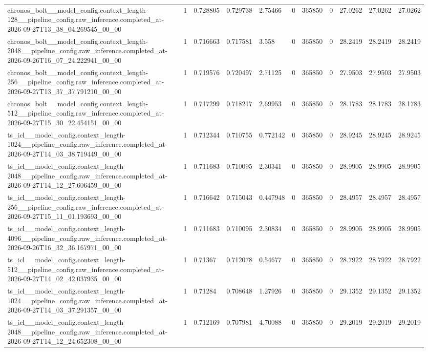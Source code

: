 \begin{tabular}{lllllllllll}
chronos\_bolt\_\_model\_config.context\_length-128\_\_pipeline\_config.raw\_inference.completed\_at-2026-09-27T13\_38\_04.269545\_00\_00 & 1 & 0.728805 & 0.729738 & 2.75466 & 0 & 365850 & 0 & 27.0262 & 27.0262 & 27.0262 \\
chronos\_bolt\_\_model\_config.context\_length-2048\_\_pipeline\_config.raw\_inference.completed\_at-2026-09-26T16\_07\_24.222941\_00\_00 & 1 & 0.716663 & 0.717581 & 3.558 & 0 & 365850 & 0 & 28.2419 & 28.2419 & 28.2419 \\
chronos\_bolt\_\_model\_config.context\_length-256\_\_pipeline\_config.raw\_inference.completed\_at-2026-09-27T13\_37\_37.791210\_00\_00 & 1 & 0.719576 & 0.720497 & 2.71125 & 0 & 365850 & 0 & 27.9503 & 27.9503 & 27.9503 \\
chronos\_bolt\_\_model\_config.context\_length-512\_\_pipeline\_config.raw\_inference.completed\_at-2026-09-27T15\_30\_22.454151\_00\_00 & 1 & 0.717299 & 0.718217 & 2.69953 & 0 & 365850 & 0 & 28.1783 & 28.1783 & 28.1783 \\
ts\_icl\_\_model\_config.context\_length-1024\_\_pipeline\_config.raw\_inference.completed\_at-2026-09-27T14\_03\_38.719449\_00\_00 & 1 & 0.712344 & 0.710755 & 0.772142 & 0 & 365850 & 0 & 28.9245 & 28.9245 & 28.9245 \\
ts\_icl\_\_model\_config.context\_length-2048\_\_pipeline\_config.raw\_inference.completed\_at-2026-09-27T14\_12\_27.606459\_00\_00 & 1 & 0.711683 & 0.710095 & 2.30341 & 0 & 365850 & 0 & 28.9905 & 28.9905 & 28.9905 \\
ts\_icl\_\_model\_config.context\_length-256\_\_pipeline\_config.raw\_inference.completed\_at-2026-09-27T15\_11\_01.193693\_00\_00 & 1 & 0.716642 & 0.715043 & 0.447948 & 0 & 365850 & 0 & 28.4957 & 28.4957 & 28.4957 \\
ts\_icl\_\_model\_config.context\_length-4096\_\_pipeline\_config.raw\_inference.completed\_at-2026-09-26T16\_32\_36.167971\_00\_00 & 1 & 0.711683 & 0.710095 & 2.30834 & 0 & 365850 & 0 & 28.9905 & 28.9905 & 28.9905 \\
ts\_icl\_\_model\_config.context\_length-512\_\_pipeline\_config.raw\_inference.completed\_at-2026-09-27T14\_02\_42.037935\_00\_00 & 1 & 0.71367 & 0.712078 & 0.54677 & 0 & 365850 & 0 & 28.7922 & 28.7922 & 28.7922 \\
ts\_icl\_\_model\_config.context\_length-1024\_\_pipeline\_config.raw\_inference.completed\_at-2026-09-27T14\_03\_37.291357\_00\_00 & 1 & 0.71284 & 0.708648 & 1.27926 & 0 & 365850 & 0 & 29.1352 & 29.1352 & 29.1352 \\
ts\_icl\_\_model\_config.context\_length-2048\_\_pipeline\_config.raw\_inference.completed\_at-2026-09-27T14\_12\_24.652308\_00\_00 & 1 & 0.712169 & 0.707981 & 4.70088 & 0 & 365850 & 0 & 29.2019 & 29.2019 & 29.2019 \\

\end{tabular}
